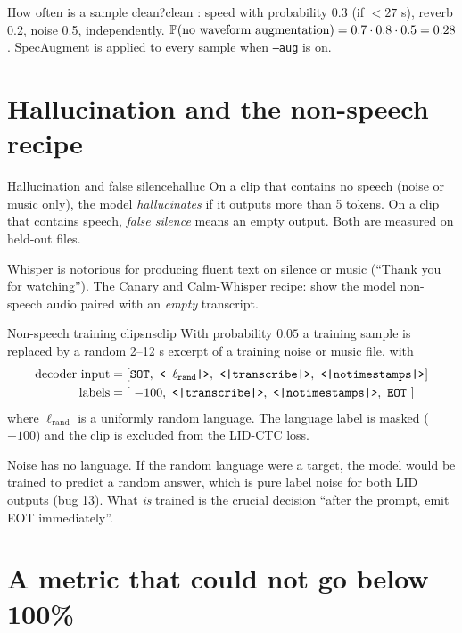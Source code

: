 \begin{example}{How often is a sample clean?}{clean}
: speed with probability 0.3 (if $<27$ s), reverb 0.2, noise 0.5, independently. $\mathbb{P}(\text{no waveform
augmentation})=0.7\cdot0.8\cdot0.5=0.28$. SpecAugment is applied to every sample when \texttt{--aug} is on.
\end{example}

\section{Hallucination and the non-speech recipe}

\begin{definition}{Hallucination and false silence}{halluc}
On a clip that contains no speech (noise or music only), the model \emph{hallucinates} if it outputs more than 5 tokens. On a clip
that contains speech, \emph{false silence} means an empty output. Both are measured on held-out files.
\end{definition}

Whisper is notorious for producing fluent text on silence or music (``Thank you for watching''). The Canary and Calm-Whisper recipe:
show the model non-speech audio paired with an \emph{empty} transcript.

\begin{definition}{Non-speech training clips}{nsclip}
With probability $0.05$ a training sample is replaced by a random 2--12 s excerpt of a training noise or music file, with
\begin{align*}
\text{decoder input}&=[\texttt{SOT},\ \tok{$\ell_{\text{rand}}$},\ \tok{transcribe},\ \tok{notimestamps}]\\
\text{labels}&=[\ -100,\ \tok{transcribe},\ \tok{notimestamps},\ \texttt{EOT}\ ]
\end{align*}
where $\ell_{\text{rand}}$ is a uniformly random language. The language label is masked ($-100$) and the clip is excluded from the
LID-CTC loss.
\end{definition}

\begin{intuition}
Noise has no language. If the random language were a target, the model would be trained to predict a random answer, which is pure
label noise for both LID outputs (bug 13). What \emph{is} trained is the crucial decision ``after the prompt, emit EOT immediately''.
\end{intuition}

\section{A metric that could not go below 100\%}

